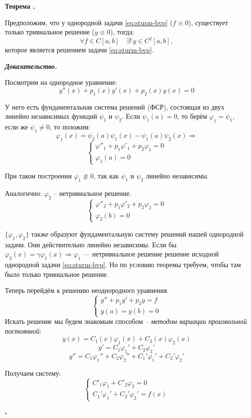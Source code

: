 \documentclass[11pt,a4paper]{report}
\numberwithin{equation}{section}
\numberwithin{figure}{chapter}
\numberwithin{table}{chapter}
\newif\ifinmathphysstatement
\newenvironment{mytheorem}[1][]{%
    \refstepcounter{theoremctr}%
    \inmathphysstatementtrue
    \begin{tcolorbox}[mathphysblock,colframe=theoremcolor,colback=theoremcolor!3,boxrule=0.8pt,#1]
    \textbf{\color{theoremcolor}Теорема \thetheoremctr.}\par\smallskip
}{%
    \end{tcolorbox}
    \inmathphysstatementfalse
}
\newenvironment{myproof}{%
    \begin{tcolorbox}[mathphysblock,colframe=proofcolor!65,colback=proofcolor!2,boxrule=0.5pt]
    \textit{\textbf{Доказательство.}}\par\smallskip
}{%
    \hfill$\square$
    \end{tcolorbox}
}
\renewcommand{\phi}{\varphi}
\begin{document}
\begin{mytheorem}
    Предположим, что у однородной задачи \eqref{eq:sturm-bvp} ($f\equiv0$), существует только тривиальное решение ($y\equiv0$), тогда:
    \[\forall f \in C[a,b]\quad \exists!\,y\in C^2[a,b],\] которое является решением задачи \eqref{eq:sturm-bvp}. 
\end{mytheorem}

\begin{myproof}
   Посмотрим на однородное уравнение:
\[
y''(x) + p_1(x)y'(x) + p_2(x)y(x) = 0
\]

У него есть фундаментальная система решений (ФСР), состоящая из двух линейно независимых 
функций $\psi_1$ и $\psi_2$. Если $\psi_1(a) = 0$, то берём $\phi_1 = \psi_1$, если же $\psi_1\neq0$, то положим:
\[
\phi_1(x) = \psi_2(a)\psi_1(x) - \psi_1(a)\psi_2(x)\Rightarrow
\]
\[\begin{cases}
    \varphi''_1+p_1\varphi'_1+p_2\varphi_1=0\\
    \varphi_1(a)=0
\end{cases}\]

При таком построении $\phi_1\not\equiv0$, так как $\psi_1$ и $\psi_2$ линейно независимы.

Аналогично: $\phi_2$ -- нетривиальное решение.
\[\begin{cases}
    \varphi''_2+p_1\varphi'_2+p_2\varphi_2=0\\
    \varphi_2(b)=0
\end{cases}\]

$\{\phi_1,\phi_2\}$ также образуют фундаментальную систему решений нашей однородной задачи. 
Они действительно линейно независимы. Если бы $\phi_2(x) = \gamma\phi_1(x)\Rightarrow \phi_1$ --- нетривиальное решение решение исходной однородной задачи \eqref{eq:sturm-bvp}. Но по условию теоремы требуем, чтобы там было только тривиальное решение.

Теперь перейдём к решению неоднородного уравнения.
\[\begin{cases}
    y''+p_1y'+p_2y=f\\
    y(a)=y(b)=0
\end{cases}\] 
Искать решение мы будем знакомым способом -- \textit{методом вариации произвольной постоянной}:
\[
y(x) = C_1(x)\phi_1(x) + C_2(x)\phi_2(x)
\]
\[
y' = C_1\phi_1' + C_2\phi_2'\]
\[y'' = C_1\phi_1'' + C_2\phi_2'' + C_1'\phi_1' + C_2'\phi_2'\]


Получаем систему:
\[
\begin{cases}
    C'_1\phi_1 + C'_2\phi_2 = 0\\
    C_1'\phi_1' + C_2'\phi_2' = f(x)
\end{cases}
\]


\end{myproof}
\end{document}
